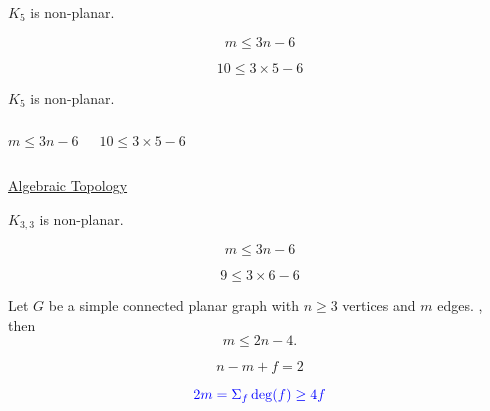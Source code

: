 \begin{frame}{}
  \begin{theorem}
    $K_{5}$ is non-planar.
  \end{theorem}


  \pause
  \[
    m \le 3n -6
  \]

  \pause
  \[
    10 \le 3 \times 5 - 6
  \]
\end{frame}

\begin{frame}{}
  \begin{theorem}
    $K_{5}$ is non-planar.
  \end{theorem}

  \begin{columns}
      \pause
      \[
        m \le 3n -6
      \]

      \[
        10 \le 3 \times 5 - 6
      \]
      \pause

      \pause
      \begin{theorem}
      \end{theorem}
  \end{columns}

  \pause
  \begin{center}
    \href{https://en.wikipedia.org/wiki/Algebraic\_topology}{Algebraic Topology}
  \end{center}
\end{frame}

\begin{frame}{}
  \begin{theorem}
    $K_{3, 3}$ is non-planar.
  \end{theorem}


  \pause
  \[
    m \le 3n -6
  \]

  \pause
  \[
    9 \le 3 \times 6 - 6
  \]

  \pause
\end{frame}

\begin{frame}{}
  \begin{theorem}
    Let $G$ be a simple connected planar graph with $n \ge 3$ vertices
    and $m$ edges. , then
    \[
      m \le 2n - 4.
    \]
  \end{theorem}

  \pause
  \[
    n - m + f = 2
  \]

  \pause
  \[
    \textcolor{blue}{2m = \Sigma_{f} \deg(f) \ge 4f}
  \]
\end{frame}

